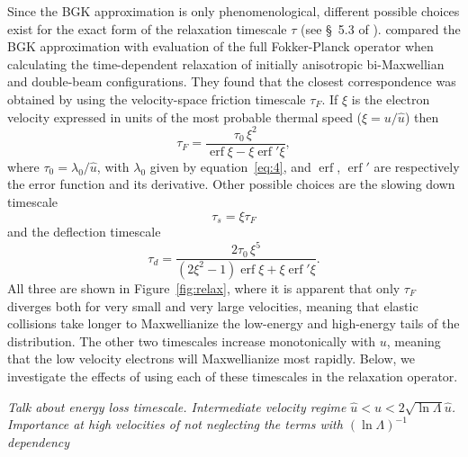 \documentclass{emulateapj}
\newcommand\ubar{\ensuremath{\hat{u}}}
\begin{document}
Since the BGK approximation is only phenomenological, different
possible choices exist for the exact form of the relaxation timescale
\(\tau\)
(see \S~5.3 of \citealp{Spitzer:1956a}).  \citet{Livi:1986a} compared the
BGK approximation with evaluation of the full Fokker-Planck operator
when calculating the time-dependent relaxation of initially
anisotropic bi-Maxwellian and double-beam configurations.  They found
that the closest correspondence was obtained by using the
velocity-space friction timescale \(\tau_{F}\).  If \(\xi\)
is the electron velocity expressed in units of the most probable thermal speed
(\(\xi = u /\ubar\)) then \newcommand\erf{\operatorname{erf}}
\begin{equation}
  \label{eq:3}
  \tau_{F} = \frac{\tau_0 \, \xi^2}{\erf\xi - \xi\erf'\!\xi}, 
\end{equation}
where \(\tau_0 = \lambda_0 / \ubar\), with \(\lambda_0\) given by
equation~\eqref{eq:4}, and \(\erf\), \(\erf'\) are respectively the
error function and its derivative. Other possible
choices are the slowing down timescale
\begin{equation}
  \label{eq:9}
  \tau_{s} = \xi \tau_{F} 
\end{equation}
and the deflection timescale 
\begin{equation}
  \label{eq:10}
  \tau_{d} = \frac{2 \tau_0 \, \xi^5}{(2\xi^2 - 1)\erf\xi + \xi\erf'\!\xi} .  
\end{equation}
All three are shown in Figure~\ref{fig:relax}, where it is apparent
that only \(\tau_F\)
diverges both for very small and very large velocities, meaning that
elastic collisions take longer to Maxwellianize the low-energy and
high-energy tails of the distribution.  The other two timescales
increase monotonically with \(u\),
meaning that the low velocity electrons will Maxwellianize most
rapidly.  Below, we investigate the effects of using each of these
timescales in the relaxation operator.

\textit{
Talk about energy loss timescale. Intermediate velocity regime \(\ubar
< u < 2 \sqrt{\ln\Lambda} \ubar\).  Importance at high velocities of not neglecting the
terms with \((\ln\Lambda)^{-1}\) dependency
\citep{Chandrasekhar:1941a}
}

\newcommand*{\vcenteredhbox}[1]{\begingroup
  \setbox0=\hbox{#1}\parbox{\wd0}{\box0}\endgroup}
\end{document}
